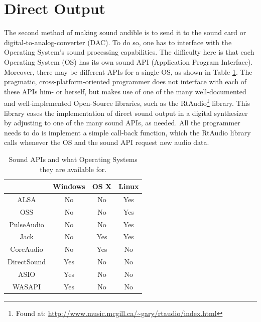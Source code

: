 \documentclass[12pt,twoside]{report}
\begin{document}
\section{Direct Output}

The second method of making sound audible is to send it to the sound card or digital-to-analog-converter (DAC). To do so, one has to interface with the Operating System's sound processing capabilities. The difficulty here is that each Operating System (OS) has its own sound API (Application Program Interface). Moreover, there may be different APIs for a single OS, as shown in Table \ref{tb:dac}. The pragmatic, cross-platform-oriented programmer does not interface with each of these APIs him- or herself, but makes use of one of the many well-documented and well-implemented Open-Source libraries, such as the RtAudio\footnote{Found at: \url{http://www.music.mcgill.ca/~gary/rtaudio/index.html}} library. This library eases the implementation of direct sound output in a digital synthesizer by adjusting to one of the many sound APIs, as needed. All the programmer needs to do is implement a simple call-back function, which the RtAudio library calls whenever the OS and the sound API request new audio data.

\begin{table}[h!]

  \begin{tabular}{c|c|c|c|}
    \cline{2-4}
    & Windows & OS X & Linux \\
    \hline
    \multicolumn{1}{|c|}{ALSA} & No & No & Yes \\
    \hline
    \multicolumn{1}{|c|}{OSS} & No & No & Yes \\
    \hline
    \multicolumn{1}{|c|}{PulseAudio} & No & No & Yes \\
    \hline
    \multicolumn{1}{|c|}{Jack} & No & Yes & Yes \\
    \hline
    \multicolumn{1}{|c|}{CoreAudio} & No & Yes & No \\
    \hline
    \multicolumn{1}{|c|}{DirectSound} & Yes & No & No \\
    \hline
    \multicolumn{1}{|c|}{ASIO} & Yes & No & No \\
    \hline
    \multicolumn{1}{|c|}{WASAPI} & Yes & No & No \\
    \hline
  \end{tabular}

  \caption{Sound APIs and what Operating Systems they are available for.}

  \label{tb:dac}

\end{table}
\end{document}
